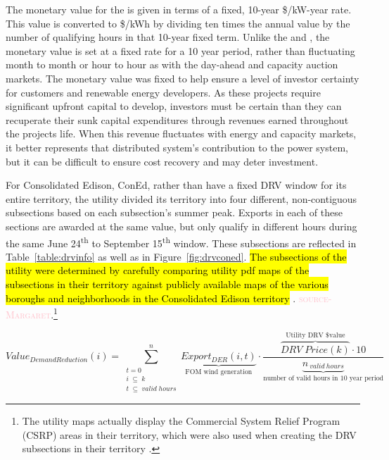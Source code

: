 The monetary value for the \drv{} is given in terms of a fixed, 10-year \$/kW-year rate. This value is converted to \$/kWh by dividing ten times the annual value by the number of qualifying hours in that 10-year fixed term. Unlike the \aev{} and \aciv{}, the \drv{} monetary value is set at a fixed rate for a 10 year period, rather than fluctuating month to month or hour to hour as with the day-ahead and capacity auction markets. The monetary value was fixed to help ensure a level of investor certainty for customers and renewable energy developers. As these projects require significant upfront capital to develop, investors must be certain than they can recuperate their sunk capital expenditures through revenues earned throughout the projects life. When this revenue fluctuates with energy and capacity markets, it better represents that distributed system's contribution to the power system, but it can be difficult to ensure cost recovery and may deter investment.  


For Consolidated Edison, ConEd, rather than have a fixed DRV window for its entire territory, the utility divided its territory into four different, non-contiguous subsections based on each subsection's summer peak. Exports in each of these sections are awarded at the same value, but only qualify in different hours during the same June 24\textsuperscript{th} to September 15\textsuperscript{th} window. These subsections are reflected in Table~\ref{table:drvinfo} as well as in Figure~\ref{fig:drvconed}. \hl{The subsections of the utility were determined by carefully comparing utility pdf maps of the subsections in their territory against publicly available maps of the various boroughs and neighborhoods in the Consolidated Edison territory} \cite{consolidated_edison_con_2019}. \textcolor{pink}{\textsc{source-Margaret}}.\footnote{The utility maps actually display the Commercial System Relief Program (CSRP) areas in their territory, which were also used when creating the DRV subsections in their territory \cite{nypsc_matter_2019}.}

\begin{equation}
Value_{Demand Reduction} (i) = \sum_{\substack{t=0 \\i\;\subseteq\;k \\t\;\subseteq\;valid\;hours}}^{n} \underbrace{Export_{DER} (i,t)}_\text{FOM wind generation} \cdot \frac{\overbrace{DRV\;Price (k)}^\text{Utility DRV \$ value} \cdot 10}{\underbrace{n_{\:valid\:hours}}_\text{number of valid hours in 10 year period}} \label{eq:3}
\end{equation}

